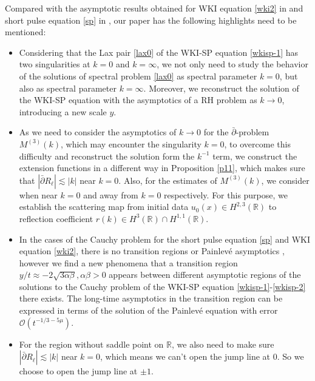 \documentclass[11pt]{article}
\numberwithin{equation}{section}
\begin{document}
  Compared with the asymptotic results obtained
  for WKI equation \eqref{wki2} in  \cite{li-2022} and short pulse equation  \eqref{sp} in \cite{YF1},  our paper has the  following highlights   need to be mentioned:
\begin{itemize}
    \item  Considering that the Lax pair \eqref{lax0} of the WKI-SP equation  \eqref{wkisp-1} has two singularities at $k=0$ and $k=\infty$, we not only need to study the behavior of the solutions of spectral problem \eqref{lax0} as spectral parameter $k=0$, but also as spectral parameter $k=\infty$. Moreover, we reconstruct the solution of the WKI-SP equation
 with the asymptotics of a RH problem  as  $k\to0$, introducing a new scale $y$.

 \item As we need to consider  the asymptotics of $k\to0$ for the $\bar\partial$-problem $M^{(3)}(k)$, which may encounter the singularity $k=0$, to overcome this difficulty and reconstruct the solution form the $k^{-1}$ term, we construct the extension functions in a different way in Proposition \ref{p11}, which makes sure that $|\bar\partial R_{\ell}|\lesssim|k|$ near $k=0$. Also, for the estimates of $M^{(3)}(k)$, we consider when near $k=0$ and away from $k=0$ respectively. For this purpose, we establish the scattering map from initial data $u_0(x)\in H^{2,3}(\mathbb{R})$ to reflection coefficient $r(k)\in H^3(\mathbb{R})\cap H^{1,1}(\mathbb{R})$.
 \item
In  the cases of  the Cauchy problem for the  short pulse equation \eqref{sp}  and WKI equation \eqref{wki2}, there is no transition regions or Painlev\'e asymptotics  \cite{li-2022,YF1}, however we find a new phenomena that a transition region  $y/t\approx -2\sqrt{3\alpha\beta},\alpha\beta>0$ appears between different asymptotic regions of the solutions to the  Cauchy problem of the WKI-SP equation \eqref{wkisp-1}-\eqref{wkisp-2} there exists.  The long-time asymptotics in the transition region can     be expressed in terms of the  solution of the  Painlev\'{e} \uppercase\expandafter{} equation with error $\mathcal{O}(t^{-1/3-5\mu})$.

  \item For the region without saddle point on $\mathbb{R}$, we also need to make sure $|\bar\partial R_{\ell}|\lesssim|k|$ near $k=0$, which means we can't open the jump line at $0$. So we choose to open the jump line at $\pm1$.


\end{itemize}
\end{document}
